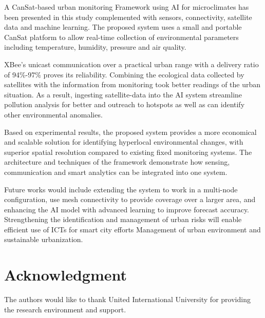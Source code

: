 \documentclass[conference]{IEEEtran}
\begin{document}
A CanSat-based urban monitoring Framework using AI for microclimates has been presented in this study complemented with sensors, connectivity, satellite data and machine learning.  The proposed system uses a small and portable CanSat platform to allow real-time collection of environmental parameters including temperature, humidity, pressure and air quality.

XBee's unicast communication over a practical urban range with a delivery ratio of 94\%-97\% proves its reliability. Combining the ecological data collected by satellites with the information from monitoring took better readings of the urban situation. As a result, ingesting satellite-data into the AI system streamline pollution analysis for better and outreach to hotspots as well as can identify other environmental anomalies.

Based on experimental results, the proposed system provides a more economical and scalable solution for identifying hyperlocal environmental changes, with superior spatial resolution compared to existing fixed monitoring systems. The architecture and techniques of the framework demonstrate how sensing, communication and smart analytics can be integrated into one system.

Future works would include extending the system to work in a multi-node configuration, use mesh connectivity to provide coverage over a larger area, and enhancing the AI model with advanced learning to improve forecast accuracy. Strengthening the identification and management of urban risks will enable efficient use of ICTs for smart city efforts Management of urban environment and sustainable urbanization.

\section*{Acknowledgment}

The authors would like to thank United International University for providing the research environment and support.
\end{document}
